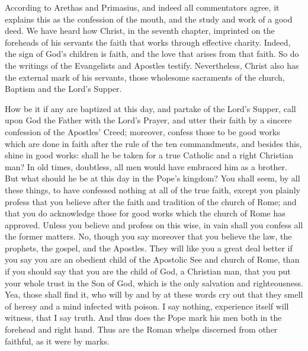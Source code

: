 According to Arethas and Primasius, and indeed all commentators agree, it explains this as the confession of the mouth, and the study and work of a good deed. We have heard how Christ, in the seventh chapter, imprinted on the foreheads of his servants the faith that works through effective charity. Indeed, the sign of God’s children is faith, and the love that arises from that faith. So do the writings of the Evangelists and Apostles testify. Nevertheless, Christ also has the external mark of his servants, those wholesome sacraments of the church, Baptism and the Lord’s Supper.

How be it if any are baptized at this day, and partake of the Lord’s Supper, call upon God the Father with the Lord’s Prayer, and utter their faith by a sincere confession of the Apostles’ Creed; moreover, confess those to be good works which are done in faith after the rule of the ten commandments, and besides this, shine in good works: shall he be taken for a true Catholic and a right Christian man? In old times, doubtless, all men would have embraced him as a brother. But what should he be at this day in the Pope’s kingdom? You shall seem, by all these things, to have confessed nothing at all of the true faith, except you plainly profess that you believe after the faith and tradition of the church of Rome; and that you do acknowledge those for good works which the church of Rome has approved. Unless you believe and profess on this wise, in vain shall you confess all the former matters. No, though you say moreover that you believe the law, the prophets, the gospel, and the Apostles. They will like you a great deal better if you say you are an obedient child of the Apostolic See and church of Rome, than if you should say that you are the child of God, a Christian man, that you put your whole trust in the Son of God, which is the only salvation and righteousness. Yea, those shall find it, who will by and by at these words cry out that they smell of heresy and a mind infected with poison. I say nothing, experience itself will witness, that I say truth. And thus does the Pope mark his men both in the forehead and right hand. Thus are the Roman whelps discerned from other faithful, as it were by marks.

